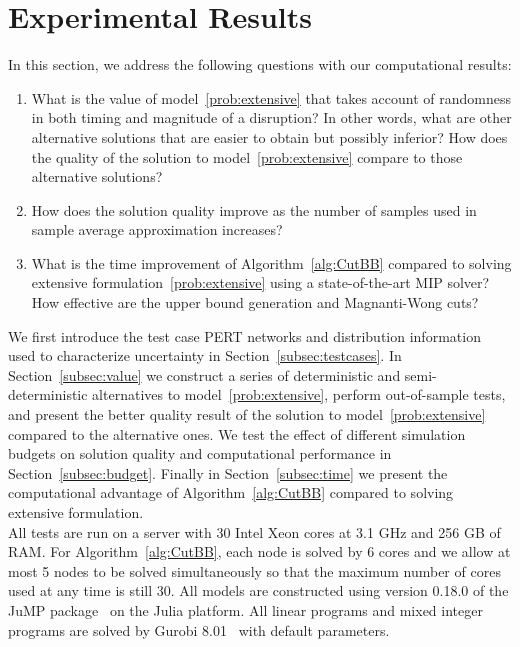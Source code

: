 \documentclass[11pt]{article}
\begin{document}
	\section{Experimental Results} \label{sec:results}
	In this section, we address the following questions with our computational results:
	\begin{enumerate}
		\item What is the value of model~\eqref{prob:extensive} that takes account of randomness in both timing and magnitude of a disruption? In other words, what are other alternative solutions that are easier to obtain but possibly inferior? How does the quality of the solution to model~\eqref{prob:extensive} compare to those alternative solutions?
		\item How does the solution quality improve as the number of samples used in sample average approximation increases? 
		\item What is the time improvement of Algorithm~\ref{alg:CutBB} compared to solving extensive formulation~\eqref{prob:extensive} using a state-of-the-art MIP solver? How effective are the upper bound generation and Magnanti-Wong cuts?
	\end{enumerate}
	We first introduce the test case PERT networks and distribution information used to characterize uncertainty in Section~\ref{subsec:testcases}. In Section~\ref{subsec:value} we construct a series of deterministic and semi-deterministic alternatives to model~\eqref{prob:extensive}, perform out-of-sample tests, and present the better quality result of the solution to model~\eqref{prob:extensive} compared to the alternative ones. We test the effect of different simulation budgets on solution quality and computational performance in Section~\ref{subsec:budget}. Finally in Section~\ref{subsec:time} we present the computational advantage of Algorithm~\ref{alg:CutBB} compared to solving extensive formulation. \\
	\newline
	All tests are run on a server with 30 Intel Xeon cores at 3.1 GHz and 256 GB of RAM. For Algorithm~\ref{alg:CutBB}, each node is solved by 6 cores and we allow at most 5 nodes to be solved simultaneously so that the maximum number of cores used at any time is still 30. All models are constructed using version 0.18.0 of the JuMP package~\citep{DunningHuchetteLubin2017} on the Julia platform. All linear programs and mixed integer programs are solved by Gurobi 8.01~\citep{gurobi2016} with default parameters.
	
\end{document}
